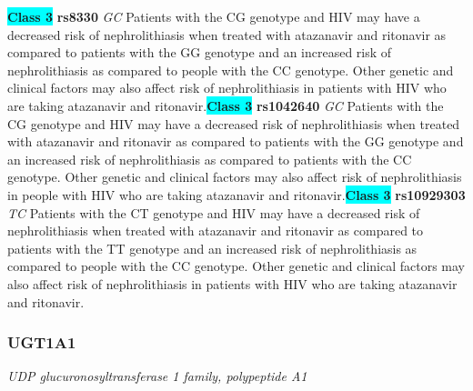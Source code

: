 \documentclass{report}
\begin{document}
\textbf{\colorbox{cyan} {Class 3}} \textbf{ rs8330 } \textit{ GC }
Patients with the CG genotype and HIV may have a decreased risk of nephrolithiasis when treated with atazanavir and ritonavir as compared to patients with the GG genotype and an increased risk of nephrolithiasis as compared to people with the CC genotype. Other genetic and clinical factors may also affect risk of nephrolithiasis in patients with HIV who are taking atazanavir and ritonavir.\newline\textbf{\colorbox{cyan} {Class 3}} \textbf{ rs1042640 } \textit{ GC }
Patients with the CG genotype and HIV may have a decreased risk of nephrolithiasis when treated with atazanavir and ritonavir as compared to patients with the GG genotype and an increased risk of nephrolithiasis as compared to patients with the CC genotype. Other genetic and clinical factors may also affect risk of nephrolithiasis in people with HIV who are taking atazanavir and ritonavir.\newline\textbf{\colorbox{cyan} {Class 3}} \textbf{ rs10929303 } \textit{ TC }
Patients with the CT genotype and HIV may have a decreased risk of nephrolithiasis when treated with atazanavir and ritonavir as compared to patients with the TT genotype and an increased risk of nephrolithiasis as compared to people with the CC genotype. Other genetic and clinical factors may also affect risk of nephrolithiasis in patients with HIV who are taking atazanavir and ritonavir. \newline\subsubsection{ UGT1A1 }
\textit{ UDP glucuronosyltransferase 1 family, polypeptide A1 }
\end{document}
